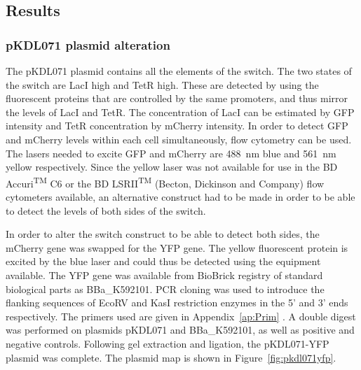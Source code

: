 \subsection{Results}

\subsubsection{pKDL071 plasmid alteration}


The pKDL071 plasmid contains all the elements of the switch. The two states of the switch are LacI high and TetR high. These are detected by using the fluorescent proteins that are controlled by the same promoters, and thus mirror the levels of LacI and TetR. The concentration of LacI can be estimated by GFP intensity and TetR concentration by mCherry intensity. In order to detect GFP and mCherry levels within each cell simultaneously, flow cytometry can be used. The lasers needed to excite GFP and mCherry are \SI{488}{\nano\meter} blue and \SI{561}{\nano\meter} yellow respectively. Since the yellow laser was not available for use in the BD Accuri\textsuperscript{TM} C6 or the BD LSRII\textsuperscript{TM} (Becton, Dickinson and Company) flow cytometers available, an alternative construct had to be made in order to be able to detect the levels of both sides of the switch. 

In order to alter the switch construct to be able to detect both sides, the mCherry gene was swapped for the YFP gene. The yellow fluorescent protein is excited by the blue laser and could thus be detected using the equipment available. The YFP gene was available from BioBrick registry of standard biological parts as BBa\_K592101. PCR cloning was used to introduce the flanking sequences of EcoRV and KasI restriction enzymes in the 5' and 3' ends respectively. The primers used are given in Appendix~\ref{ap:Prim} . A double digest was performed on plasmids pKDL071 and BBa\_K592101, as well as positive and negative controls. Following gel extraction and ligation, the pKDL071-YFP plasmid was complete. The plasmid map is shown in Figure~\ref{fig:pkdl071yfp}.


